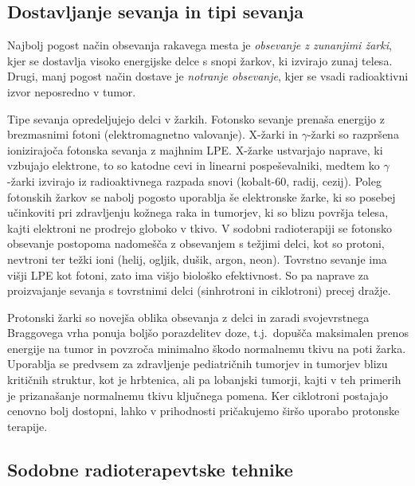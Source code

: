 \documentclass[journal]{IEEEtran}
\begin{document}
\subsection{Dostavljanje sevanja in tipi sevanja}

Najbolj pogost način obsevanja rakavega mesta je \emph{obsevanje z zunanjimi žarki}, kjer se dostavlja visoko energijske delce s snopi žarkov, ki izvirajo zunaj telesa. Drugi, manj pogost način dostave je \emph{notranje obsevanje}, kjer se vsadi radioaktivni izvor neposredno v tumor.

Tipe sevanja opredeljujejo delci v žarkih. Fotonsko sevanje prenaša energijo z brezmasnimi fotoni (elektromagnetno valovanje). X-žarki in $\gamma$-žarki so razpršena ionizirajoča fotonska sevanja z majhnim LPE. X-žarke ustvarjajo naprave, ki vzbujajo elektrone, to so katodne cevi in linearni pospeševalniki, medtem ko $\gamma$-žarki izvirajo iz radioaktivnega razpada snovi (kobalt-60, radij, cezij). Poleg fotonskih žarkov se nabolj pogosto uporablja še elektronske žarke, ki so posebej učinkoviti pri zdravljenju kožnega raka in tumorjev, ki so blizu površja telesa, kajti elektroni ne prodrejo globoko v tkivo. V sodobni radioterapiji se fotonsko obsevanje postopoma nadomešča z obsevanjem s težjimi delci, kot so protoni, nevtroni ter težki ioni (helij, ogljik, dušik, argon, neon). Tovrstno sevanje ima višji LPE kot fotoni, zato ima višjo biološko efektivnost. So pa naprave za proizvajanje sevanja s tovrstnimi delci (sinhrotroni in ciklotroni) precej dražje.

Protonski žarki so novejša oblika obsevanja z delci in zaradi svojevrstnega Braggovega vrha ponuja boljšo porazdelitev doze, t.j.~dopušča maksimalen prenos energije na tumor in povzroča minimalno škodo normalnemu tkivu na poti žarka. Uporablja se predvsem za zdravljenje pediatričnih tumorjev in tumorjev blizu kritičnih struktur, kot je hrbtenica, ali pa lobanjski tumorji,
kajti v teh primerih je prizanašanje normalnemu tkivu ključnega pomena. Ker ciklotroni postajajo cenovno bolj dostopni, lahko v prihodnosti pričakujemo širšo uporabo protonske terapije.

\subsection{Sodobne radioterapevtske tehnike}
\end{document}
